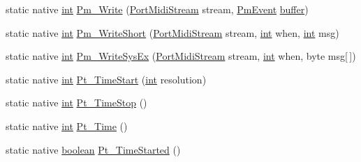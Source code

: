 \begin{DoxyCompactItemize}
\item 
static native \hyperlink{xmltok_8h_a5a0d4a5641ce434f1d23533f2b2e6653}{int} \hyperlink{classjportmidi_1_1_j_port_midi_api_a6a4b3f64a85d26d85dd3a9de83fcdbc5}{Pm\+\_\+\+Write} (\hyperlink{portmidi_8h_af4949219ee1bb0afc857cb242d123914}{Port\+Midi\+Stream} stream, \hyperlink{struct_pm_event}{Pm\+Event} \hyperlink{structbuffer}{buffer})
\item 
static native \hyperlink{xmltok_8h_a5a0d4a5641ce434f1d23533f2b2e6653}{int} \hyperlink{classjportmidi_1_1_j_port_midi_api_a9d4ca73be60b6fc66edd261c9139f070}{Pm\+\_\+\+Write\+Short} (\hyperlink{portmidi_8h_af4949219ee1bb0afc857cb242d123914}{Port\+Midi\+Stream} stream, \hyperlink{xmltok_8h_a5a0d4a5641ce434f1d23533f2b2e6653}{int} when, \hyperlink{xmltok_8h_a5a0d4a5641ce434f1d23533f2b2e6653}{int} msg)
\item 
static native \hyperlink{xmltok_8h_a5a0d4a5641ce434f1d23533f2b2e6653}{int} \hyperlink{classjportmidi_1_1_j_port_midi_api_a2e9826ebb1854b9f29a7429302952034}{Pm\+\_\+\+Write\+Sys\+Ex} (\hyperlink{portmidi_8h_af4949219ee1bb0afc857cb242d123914}{Port\+Midi\+Stream} stream, \hyperlink{xmltok_8h_a5a0d4a5641ce434f1d23533f2b2e6653}{int} when, byte msg\mbox{[}$\,$\mbox{]})
\item 
static native \hyperlink{xmltok_8h_a5a0d4a5641ce434f1d23533f2b2e6653}{int} \hyperlink{classjportmidi_1_1_j_port_midi_api_abcdd7ed0a3ef43f5eabc80613bba9930}{Pt\+\_\+\+Time\+Start} (\hyperlink{xmltok_8h_a5a0d4a5641ce434f1d23533f2b2e6653}{int} resolution)
\item 
static native \hyperlink{xmltok_8h_a5a0d4a5641ce434f1d23533f2b2e6653}{int} \hyperlink{classjportmidi_1_1_j_port_midi_api_a48179111c7ec1a231b76802d227f58a7}{Pt\+\_\+\+Time\+Stop} ()
\item 
static native \hyperlink{xmltok_8h_a5a0d4a5641ce434f1d23533f2b2e6653}{int} \hyperlink{classjportmidi_1_1_j_port_midi_api_a9a0cb50f4e4866f94f0fb4b759489b2a}{Pt\+\_\+\+Time} ()
\item 
static native \hyperlink{cext_8h_a7670a4e8a07d9ebb00411948b0bbf86d}{boolean} \hyperlink{classjportmidi_1_1_j_port_midi_api_a635841ecb688fbd598103020e89b6d28}{Pt\+\_\+\+Time\+Started} ()
\end{DoxyCompactItemize}
